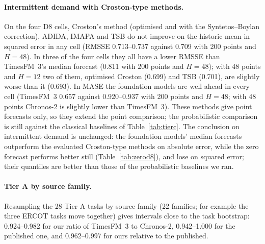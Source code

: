 \paragraph{Intermittent demand with Croston-type methods.} On the four D8 cells, Croston's method (optimised and with the
Syntetos--Boylan correction), ADIDA, IMAPA and TSB do not improve on the historic mean in squared error in any cell (RMSSE
0.713--0.737 against 0.709 with 200 points and $H = 48$). In three of the four cells they all have a lower RMSSE than TimesFM~3's
median forecast (0.811 with 200 points and $H = 48$); with 48 points and $H = 12$ two of them, optimised Croston (0.699) and TSB (0.701), are slightly worse than
it (0.693). In MASE the foundation models are well ahead in every cell (TimesFM~3 0.657 against 0.920--0.937 with 200 points and
$H = 48$; with 48 points Chronos-2 is slightly lower than TimesFM~3). These methods give point forecasts only, so they extend the
point comparison; the probabilistic comparison is still against the classical baselines of Table~\ref{tab:tierc}. The conclusion on
intermittent demand is unchanged: the foundation models' median forecasts outperform the evaluated Croston-type methods on absolute error, while the zero forecast
performs better still (Table~\ref{tab:zerod8}), and lose on squared error; their quantiles are better than those of the probabilistic baselines we ran.

\paragraph{Tier A by source family.} Resampling the 28 Tier A tasks by source family (22 families; for example the three ERCOT
tasks move together) gives intervals close to the task bootstrap: 0.924--0.982 for our ratio of TimesFM~3 to Chronos-2,
0.942--1.000 for the published one, and 0.962--0.997 for ours relative to the published.



\begin{table}[!htbp]
\centering
\caption{Robustness of family P (added after the freeze; not pre-specified). Ratios under the pre-specified nested equal weights,
pooled over windows, per series, as a ratio of mean errors, as the median log ratio, and without river flow; Holm-adjusted $p$ and
decision under a delete-one-cluster jackknife with $t_7$ critical values and under the two-way bootstrap with two-week time blocks.}
\label{tab:robustness}
\scriptsize
\setlength{\tabcolsep}{3pt}

\end{table}
